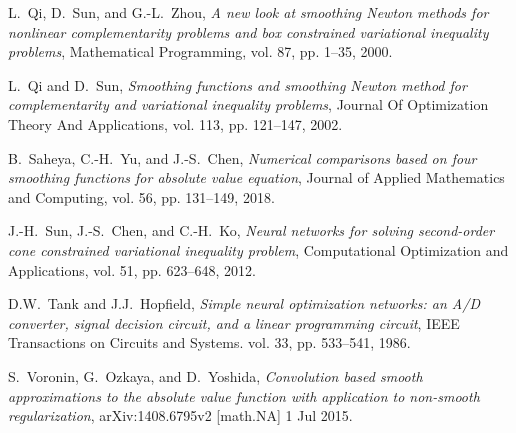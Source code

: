 \documentclass[12pt]{article}
\begin{document}
\begin{thebibliography}{1}
 {\sc L.\ Qi, D.\ Sun, and G.-L.\ Zhou},
 {\em A new look at smoothing Newton methods for nonlinear complementarity problems
 and box constrained variational inequality problems},
 Mathematical Programming, vol. 87, pp. 1--35, 2000.

 {\sc L.\ Qi and D.\ Sun},
 {\em Smoothing functions and smoothing Newton method for complementarity and variational
 inequality problems},
 Journal Of Optimization Theory And Applications, vol. 113, pp. 121--147, 2002.

%
%

 {\sc B.\ Saheya, C.-H.\ Yu, and J.-S.\ Chen},
 {\em Numerical comparisons based on four smoothing functions for absolute value equation},
 Journal of Applied Mathematics and Computing, vol. 56, pp. 131--149, 2018.

 {\sc J.-H.\ Sun, J.-S.\ Chen, and C.-H.\ Ko},
 {\em Neural networks for solving second-order cone constrained variational inequality problem},
  Computational Optimization and Applications, vol. 51, pp. 623--648, 2012.

 {\sc D.W.\ Tank and J.J.\ Hopfield},
 {\em  Simple neural optimization networks: an A/D converter, signal decision circuit,
 and a linear programming circuit},
 IEEE Transactions on Circuits and Systems. vol. 33, pp. 533--541, 1986.

 {\sc S.\ Voronin, G.\ Ozkaya, and D.\ Yoshida},
 {\em Convolution based smooth approximations to the absolute value function with application
 to non-smooth regularization},
 arXiv:1408.6795v2 [math.NA] 1 Jul 2015.

%
%
%


\end{thebibliography}
\end{document}

